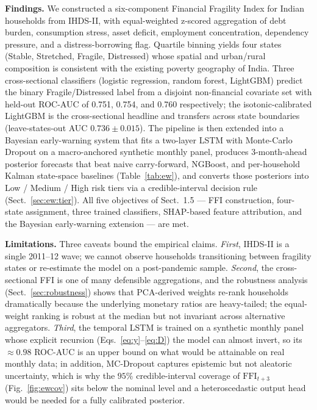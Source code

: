 \documentclass[colorlinks,balance]{asmeconf}
\begin{document}
\textbf{Findings.} We constructed a six-component Financial Fragility Index for Indian households from IHDS-II, with equal-weighted z-scored aggregation of debt burden, consumption stress, asset deficit, employment concentration, dependency pressure, and a distress-borrowing flag. Quartile binning yields four states (Stable, Stretched, Fragile, Distressed) whose spatial and urban/rural composition is consistent with the existing poverty geography of India. Three cross-sectional classifiers (logistic regression, random forest, LightGBM) predict the binary Fragile/Distressed label from a disjoint non-financial covariate set with held-out ROC-AUC of 0.751, 0.754, and 0.760 respectively; the isotonic-calibrated LightGBM is the cross-sectional headline and transfers across state boundaries (leave-states-out AUC $0.736 \pm 0.015$). The pipeline is then extended into a Bayesian early-warning system that fits a two-layer LSTM with Monte-Carlo Dropout on a macro-anchored synthetic monthly panel, produces 3-month-ahead posterior forecasts that beat naive carry-forward, NGBoost, and per-household Kalman state-space baselines (Table~\ref{tab:ew}), and converts those posteriors into Low / Medium / High risk tiers via a credible-interval decision rule (Sect.~\ref{sec:ew:tier}). All five objectives of Sect.~1.5 --- FFI construction, four-state assignment, three trained classifiers, SHAP-based feature attribution, and the Bayesian early-warning extension --- are met.

\textbf{Limitations.} Three caveats bound the empirical claims. \textit{First}, IHDS-II is a single 2011--12 wave; we cannot observe households transitioning between fragility states or re-estimate the model on a post-pandemic sample. \textit{Second}, the cross-sectional FFI is one of many defensible aggregations, and the robustness analysis (Sect.~\ref{sec:robustness}) shows that PCA-derived weights re-rank households dramatically because the underlying monetary ratios are heavy-tailed; the equal-weight ranking is robust at the median but not invariant across alternative aggregators. \textit{Third}, the temporal LSTM is trained on a synthetic monthly panel whose explicit recursion (Eqs.~\eqref{eq:y}--\eqref{eq:D}) the model can almost invert, so its $\approx\!0.98$ ROC-AUC is an upper bound on what would be attainable on real monthly data; in addition, MC-Dropout captures epistemic but not aleatoric uncertainty, which is why the $95\%$ credible-interval coverage of $\mathrm{FFI}_{t+3}$ (Fig.~\ref{fig:ewcov}) sits below the nominal level and a heteroscedastic output head would be needed for a fully calibrated posterior.
\end{document}
